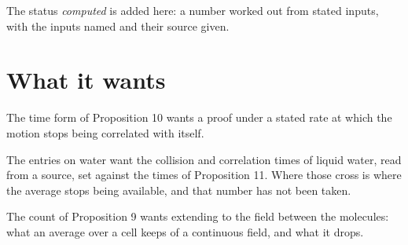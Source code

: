 The status \emph{computed} is added here: a number worked out from stated inputs, with the inputs
named and their source given.

\section{What it wants}

The time form of Proposition 10 wants a proof under a stated rate at which the motion stops being
correlated with itself.

The entries on water want the collision and correlation times of liquid water, read from a source,
set against the times of Proposition 11. Where those cross is where the average stops being
available, and that number has not been taken.

The count of Proposition 9 wants extending to the field between the molecules: what an average over
a cell keeps of a continuous field, and what it drops.
